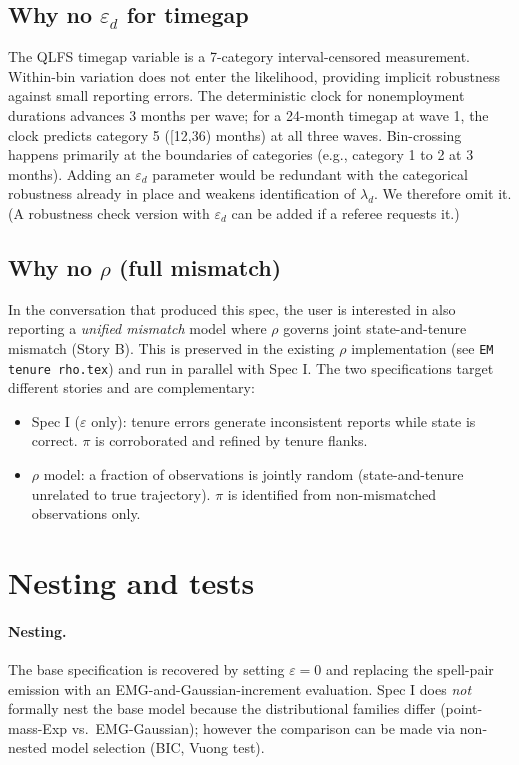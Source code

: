 \documentclass[12pt]{article}
\begin{document}
\subsection{Why no \(\varepsilon_d\) for timegap}

The QLFS timegap variable is a 7-category interval-censored measurement.
Within-bin variation does not enter the likelihood, providing implicit
robustness against small reporting errors. The deterministic clock for
nonemployment durations advances 3 months per wave; for a 24-month timegap
at wave 1, the clock predicts category 5 ([12,36) months) at all three
waves. Bin-crossing happens primarily at the boundaries of categories
(e.g., category 1 to 2 at 3 months). Adding an \(\varepsilon_d\) parameter
would be redundant with the categorical robustness already in place and
weakens identification of \(\lambda_d\). We therefore omit it. (A robustness
check version with \(\varepsilon_d\) can be added if a referee requests it.)

\subsection{Why no \(\rho\) (full mismatch)}

In the conversation that produced this spec, the user is interested in
also reporting a \emph{unified mismatch} model where \(\rho\) governs joint
state-and-tenure mismatch (Story B). This is preserved in the existing
\(\rho\) implementation (see \texttt{EM tenure rho.tex}) and run in parallel
with Spec I. The two specifications target different stories and are
complementary:

\begin{itemize}
\item Spec I (\(\varepsilon\) only): tenure errors generate inconsistent
  reports while state is correct. \(\pi\) is corroborated and refined by
  tenure flanks.
\item \(\rho\) model: a fraction of observations is jointly random
  (state-and-tenure unrelated to true trajectory). \(\pi\) is identified
  from non-mismatched observations only.
\end{itemize}

\section{Nesting and tests}

\paragraph{Nesting.} The base specification is recovered by setting
\(\varepsilon = 0\) and replacing the spell-pair emission with an
EMG-and-Gaussian-increment evaluation. Spec I does \emph{not} formally
nest the base model because the distributional families differ
(point-mass-Exp vs.\ EMG-Gaussian); however the comparison can be made via
non-nested model selection (BIC, Vuong test).
\end{document}
